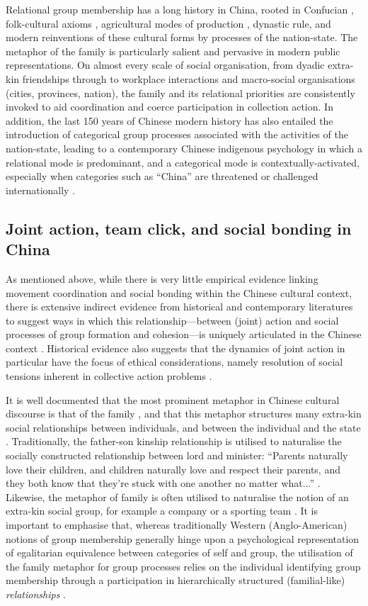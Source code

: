   Relational group membership has a long history in China, rooted in Confucian \citep{Hwang1999}, folk-cultural axioms \citep{Wang2009}, agricultural modes of production \citep{Talhelm2014,Fei1992}, dynastic rule, and modern reinventions of these cultural forms by processes of the nation-state\citep{Liu2014}. The metaphor of the family is particularly salient and pervasive in modern public representations.  On almost every scale of social organisation, from dyadic extra-kin friendships through to workplace interactions and macro-social organisations (cities, provinces, nation), the family and its relational priorities are consistently invoked to aid coordination and coerce participation in collection action.
  In addition, the last 150 years of Chinese modern history has also entailed the introduction of categorical group processes associated with the activities of the nation-state, leading to a contemporary Chinese indigenous psychology in which a relational mode is predominant, and a categorical mode is contextually-activated, especially when categories such as ``China'' are threatened or challenged internationally \citep{Liu2009}.


  \subsection{Joint action, team click, and social bonding in China}
  As mentioned above, while there is very little empirical evidence linking movement coordination and social bonding within the Chinese cultural context, there is extensive indirect evidence from historical and contemporary literatures to suggest ways in which this relationship---between (joint) action and social processes of group formation and cohesion---is uniquely articulated in the Chinese context \citep{Weed2011}.  Historical evidence also suggests that the dynamics of joint action in particular have the focus of ethical considerations, namely resolution of social tensions inherent in collective action problems \citep{Slingerland2014}.

  It is well documented that the most prominent metaphor in Chinese cultural discourse is that of the family \citep{Maehr1980}, and that this metaphor structures many extra-kin social relationships between individuals, and between the individual and the state \citep{Gold2002}.  Traditionally, the father-son kinship relationship is utilised to naturalise the socially constructed relationship between lord and minister: ``Parents naturally love their children, and children naturally love and respect their parents, and they both know that they're stuck with one another no matter what...'' \citep[178]{Slingerland2014}. Likewise, the metaphor of family is often utilised to naturalise the notion of an extra-kin social group, for example a company or a sporting team \citep{Brownell2008}.
  It is important to emphasise that, whereas traditionally Western (Anglo-American) notions of group membership generally hinge upon a psychological representation of egalitarian equivalence between categories of self and group, the utilisation of the family metaphor for group processes relies on the individual identifying group membership through a participation in hierarchically structured (familial-like) \textit{relationships} \citep{Fei1992}.

